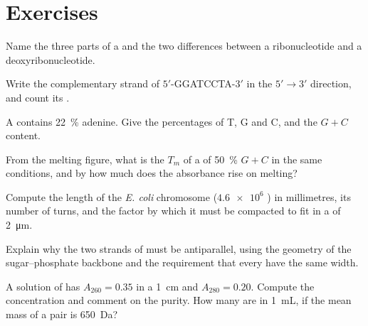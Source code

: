 \section{Exercises}

\begin{exercise}[$\star$]\label{exo:b1:nucleic-acids:1}
Name the three parts of a  and the two differences between
a ribonucleotide and a deoxyribonucleotide.
\end{exercise}

\begin{exercise}[$\star$]\label{exo:b1:nucleic-acids:2}
Write the complementary strand of $5'$-GGATCCTA-$3'$ in the $5' \to 3'$
direction, and count its .
\end{exercise}

\begin{exercise}[$\star$]\label{exo:b1:nucleic-acids:3}
A  contains \qty{22}{\%} adenine. Give the percentages of T, G and
C, and the $G + C$ content.
\end{exercise}

\begin{exercise}[$\star$]\label{exo:b1:nucleic-acids:4}
From the melting figure, what is the $T_m$ of a  of \qty{50}{\%}
$G + C$ in the same conditions, and by how much does the absorbance
rise on melting?
\end{exercise}

\begin{exercise}[$\star\star$]\label{exo:b1:nucleic-acids:5}
Compute the length of the \emph{E. coli} chromosome ($\num{4.6e6}$
) in millimetres, its number of turns, and the factor by
which it must be compacted to fit in a  of \qty{2}{\micro m}.
\end{exercise}

\begin{exercise}[$\star\star$]\label{exo:b1:nucleic-acids:6}
Explain why the two strands of  must be antiparallel, using the
geometry of the sugar--phosphate backbone and the requirement that
every  have the same width.
\end{exercise}

\begin{exercise}[$\star\star$]\label{exo:b1:nucleic-acids:7}
A solution of  has $A_{260} = 0.35$ in a \qty{1}{cm}  and
$A_{280} = 0.20$. Compute the concentration and comment on the purity.
How many  are in \qty{1}{mL}, if the mean mass of a pair is
\qty{650}{Da}?
\end{exercise}

